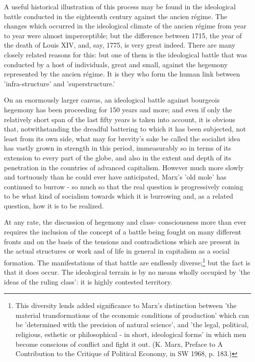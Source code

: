 A useful historical illustration of this process may be found in the ideological battle conducted in the eighteenth century against the ancien régime. The changes which occurred in the ideological climate of the ancien régime from year to year were almost imperceptible; but the difference between 1715, the year of the death of Louis XIV, and, say, 1775, is very great indeed. There are many closely related reasons for this: but one of them is the ideological battle that was conducted by a host of individuals, great and small, against the hegemony represented by the ancien régime. It is they who form the human link between 'infra-structure' and 'superstructure.'

On an enormously larger canvas, an ideological battle against bourgeois hegemony has been proceeding for 150 years and more; and even if only the relatively short span of the last fifty years is taken into account, it is obvious that, notwithstanding the dreadful battering to which it has been subjected, not least from its own side, what may for brevity's sake be called the socialist idea has vastly grown in strength in this period, immeasurably so in terms of its extension to every part of the globe, and also in the extent and depth of its penetration in the countries of advanced capitalism. However much more slowly and tortuously than he could ever have anticipated, Marx's 'old mole' has continued to burrow - so much so that the real question is progressively coming to be what kind of socialism towards which it is burrowing and, as a related question, how it is to be realized.

At any rate, the discussion of hegemony and class- consciousness more than ever requires the inclusion of the concept of a battle being fought on many different fronts and on the basis of the tensions and contradictions which are present in the actual structures or work and of life in general in capitalism as a social formation. The manifestations of that battle are endlessly diverse;\footnote{This diversity lends added significance to Marx's distinction between 'the material transformations of the economic conditions of production' which can be 'determined with the precision of natural science', and 'the legal, political, religious, esthetic or philosophical - in short, ideological forms' in which men become conscious of conflict and fight it out. (K. Marx, Preface to A Contribution to the Critique of Political Economy, in SW 1968, p. 183.)} but the fact is that it does occur. The ideological terrain is by no means wholly occupied by 'the ideas of the ruling class': it is highly contested territory.

